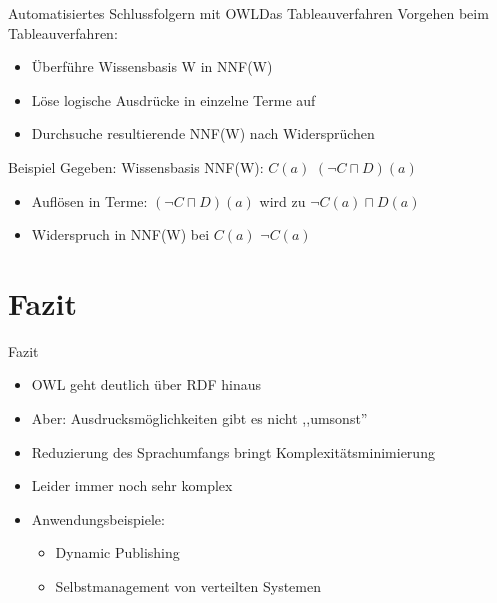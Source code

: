 \documentclass{beamer}
\begin{document}
\begin{frame}{Automatisiertes Schlussfolgern mit OWL}{Das Tableauverfahren}
Vorgehen beim Tableauverfahren:
\begin{itemize}
	\item Überführe Wissensbasis W in NNF(W)
	\item Löse logische Ausdrücke in einzelne Terme auf
	\item Durchsuche resultierende NNF(W) nach Widersprüchen
\end{itemize}
\begin{block}{Beispiel}
Gegeben: Wissensbasis NNF(W): $ C(a) $  $ (\neg C \sqcap D)(a) $
\begin{itemize}
	\item Auflösen in Terme: $ (\neg C \sqcap D)(a) $ wird zu $ \neg C(a) \sqcap D(a) $
	\item Widerspruch in NNF(W) bei $ C(a) $ $ \neg C(a) $ 
\end{itemize}
\end{block}	
\end{frame}

\section{Fazit}
\begin{frame}{Fazit}
\begin{itemize}
\item OWL geht deutlich über RDF hinaus
\item Aber: Ausdrucksmöglichkeiten gibt es nicht ,,umsonst''
\item Reduzierung des Sprachumfangs bringt Komplexitätsminimierung
\item Leider immer noch sehr komplex
\item Anwendungsbeispiele:
\begin{itemize}
\item Dynamic Publishing
\item Selbstmanagement von verteilten Systemen
\end{itemize}
\end{itemize}
\end{frame}
\end{document}
